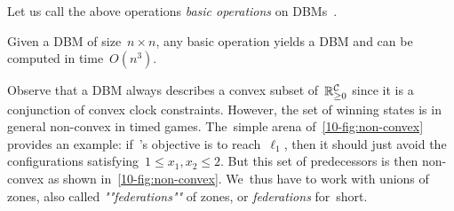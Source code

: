 Let us call the above operations \emph{basic operations} on DBMs~\cite{BY04}.
\begin{theorem}
  Given a DBM of size~$n\times n$, any basic operation yields a DBM
  and can be computed in time~$O(n^3)$.
\end{theorem}



Observe that a DBM always describes a convex subset
of~$\mathbb{R}_{\geq 0}^{\mathcal{C}}$ since it is a conjunction of convex clock
constraints. However, the set of winning states is in general
non-convex in timed games. The~simple arena
of~\cref{10-fig:non-convex} provides an example: if~\Eve's objective
is to reach~$\ell_1$, then it should just avoid the configurations
satisfying~$1\leq x_1,x_2\leq 2$. But this set of predecessors is then
non-convex as shown in~\cref{10-fig:non-convex}.
We~thus have to work with unions of zones, also called
\emph{""federations""} of zones, or \emph{federations} for~short.

